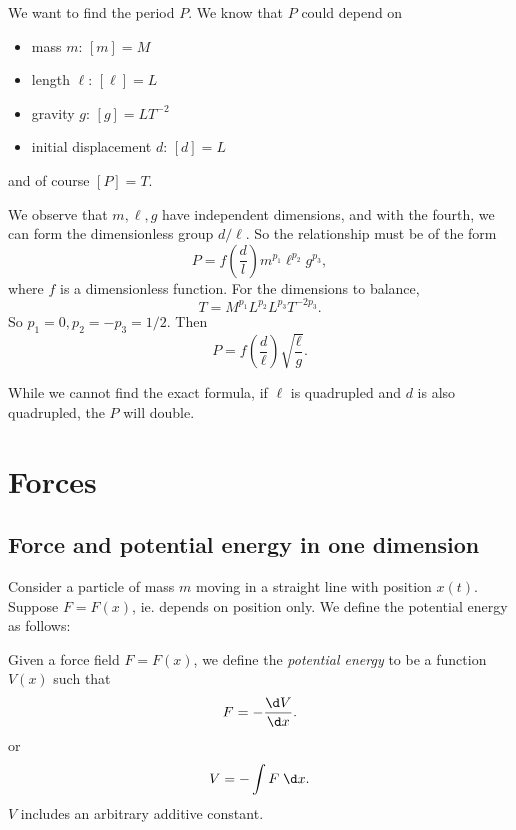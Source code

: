 \documentclass[a4paper]{article}
\begin{document}
\begin{eg}\leavevmode
  \begin{center}
  \end{center}
  We want to find the period $P$. We know that $P$ could depend on 
  \begin{itemize}
    \item mass $m$: $[m] = M$
    \item length $\ell$: $[\ell] = L$
    \item gravity $g$: $[g] = LT^{-2}$
    \item initial displacement $d$: $[d] = L$
  \end{itemize}
  and of course $[P] = T$.

  We observe that $m, \ell, g$ have independent dimensions, and with the fourth, we can form the dimensionless group $d/\ell$. So the relationship must be of the form
  \[
    P = f\left(\frac{d}{l}\right) m^{p_1}\ell^{p_2}g^{p_3},
  \]
  where $f$ is a dimensionless function. For the dimensions to balance,
  \[
    T = M^{p_1}L^{p_2}L^{p_3}T^{-2p_3}.
  \]
  So $p_1 = 0, p_2 = -p_3 = 1/2$. Then
  \[
    P = f\left(\frac{d}{\ell}\right) \sqrt{\frac{\ell}{g}}.
  \]

  While we cannot find the exact formula, if $\ell$ is quadrupled and $d$ is also quadrupled, the $P$ will double. 
\end{eg}

\section{Forces}
\subsection{Force and potential energy in one dimension}
Consider a particle of mass $m$ moving in a straight line with position $x(t)$. Suppose $F = F(x)$, ie. depends on position only. We define the potential energy as follows:
\begin{defi}
  Given a force field $F = F(x)$, we define the \emph{potential energy} to be a function $V(x)$ such that
  \[
    F = -\frac{\d V}{\d x}.
  \]
  or
  \[
    V = -\int F \;\d x.
  \]
  $V$ includes an arbitrary additive constant.
\end{defi}
\end{document}
